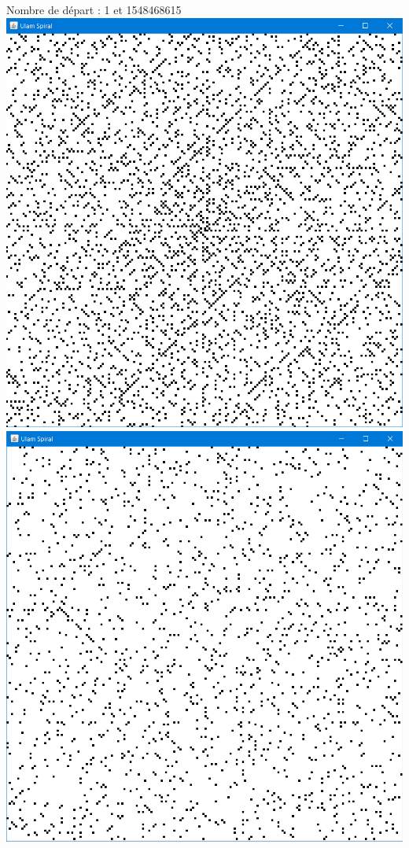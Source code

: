 \documentclass{beamer}
\begin{document}
\begin{frame}
\begin{center}
Nombre de départ : 1 et 1548468615\\
\vspace{0.2cm}
\includegraphics[scale=0.25]{images/spirale_1.PNG}
\includegraphics[scale=0.25]{images/spirale_grandNB.PNG}
\end{center}
\end{frame}
\end{document}
